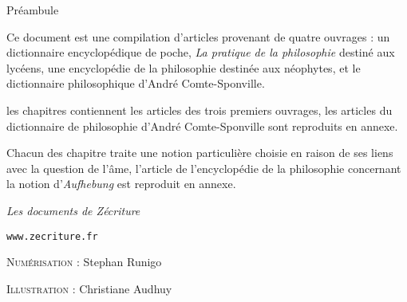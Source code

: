 
\thispagestyle{empty}

\begin{center}
\Large
Préambule
\normalsize
\end{center}
\vspace{3cm}


Ce document est une compilation d'articles provenant de quatre ouvrages : un dictionnaire encyclopédique de poche, {\it La pratique de la philosophie} destiné aux lycéens, une encyclopédie de la philosophie destinée aux néophytes, et le dictionnaire philosophique d'André Comte-Sponville.

\vspace{1.3cm}

les chapitres contiennent les articles des trois premiers ouvrages, les articles du dictionnaire de philosophie d'André Comte-Sponville sont reproduits en annexe.

Chacun des chapitre traite une notion particulière choisie en raison de ses liens avec la question de l'âme,
l'article de l'encyclopédie de la philosophie concernant la notion d'{\it Aufhebung} est reproduit en annexe.



\vspace{1.3cm}



\vspace{2.3cm}

\hfill {\it Les documents de Zécriture}

\hfill \texttt{www.zecriture.fr}

\vspace{1.3cm}

\hfill \textsc{Numérisation :} Stephan Runigo

\hfill \textsc{Illustration :} Christiane Audhuy

